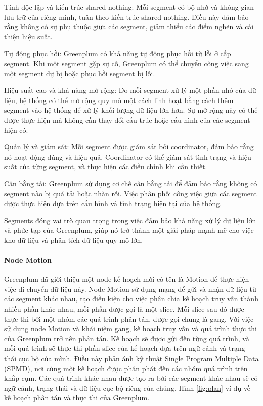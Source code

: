 \documentclass[14pt]{article}
\begin{document}
Tính độc lập và kiến trúc shared-nothing:
Mỗi segment có bộ nhớ và không gian lưu trữ của riêng mình, tuân theo kiến trúc shared-nothing. Điều này đảm bảo rằng không có sự phụ thuộc giữa các segment, giảm thiểu các điểm nghẽn và cải thiện hiệu suất.

Tự động phục hồi: Greenplum có khả năng tự động phục hồi từ lỗi ở cấp segment. Khi một segment gặp sự cố, Greenplum có thể chuyển công việc sang một segment dự bị hoặc phục hồi segment bị lỗi.

Hiệu suất cao và khả năng mở rộng: Do mỗi segment xử lý một phần nhỏ của dữ liệu, hệ thống có thể mở rộng quy mô một cách linh hoạt bằng cách thêm segment vào hệ thống để xử lý khối lượng dữ liệu lớn hơn.
Sự mở rộng này có thể được thực hiện mà không cần thay đổi cấu trúc hoặc
cấu hình của các segment hiện có.

Quản lý và giám sát:
Mỗi segment được giám sát bởi coordinator, đảm bảo rằng nó hoạt động đúng
và hiệu quả. Coordinator có thể giám sát tình trạng và hiệu suất của từng segment, và thực hiện các điều chỉnh khi cần thiết.

Cân bằng tải: Greenplum sử dụng cơ chế cân bằng tải để đảm bảo rằng không có segment nào bị quá tải hoặc nhàn rỗi.
Việc phân phối công việc giữa các segment được thực hiện dựa trên cấu hình và tình trạng hiện tại của hệ thống.

Segments đóng vai trò quan trọng trong việc đảm bảo khả năng xử lý dữ liệu lớn và phức tạp của Greenplum, giúp nó trở thành một giải pháp mạnh mẽ cho việc kho dữ liệu và phân tích dữ liệu quy mô lớn.

\paragraph{Node Motion}

Greenplum đã giới thiệu một node kế hoạch mới có tên là Motion để thực hiện việc di chuyển dữ liệu này. Node Motion sử dụng mạng để gửi và nhận dữ liệu từ các segment khác nhau, tạo điều kiện cho việc phân chia kế hoạch truy vấn thành nhiều phần khác nhau, mỗi phần được gọi là một slice. Mỗi slice sau đó được thực thi bởi một nhóm các quá trình phân tán, được gọi chung là gang. Với việc sử dụng node Motion và khái niệm gang, kế hoạch truy vấn và quá trình thực thi của Greenplum trở nên phân tán. Kế hoạch sẽ được gửi đến từng quá trình, và mỗi quá trình sẽ thực thi phần slice của kế hoạch dựa trên ngữ cảnh và trạng thái cục bộ của mình. Điều này phản ánh kỹ thuật Single Program Multiple Data (SPMD), nơi cùng một kế hoạch được phân phát đến các nhóm quá trình trên khắp cụm. Các quá trình khác nhau được tạo ra bởi các segment khác nhau sẽ có ngữ cảnh, trạng thái và dữ liệu cục bộ riêng của chúng. Hình \ref{fig:plan} ví dụ về kế hoạch phân tán và thực thi của Greenplum.
\end{document}
